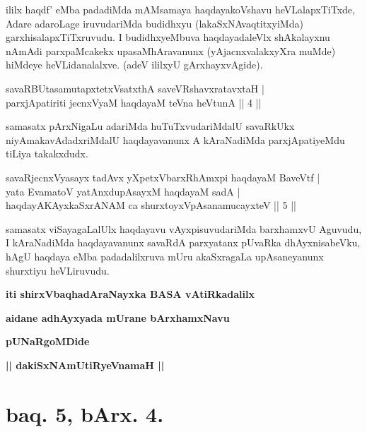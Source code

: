 \begin{artha}
ililx haqdf' eMba padadiMda mAMsamaya haqdayakoVshavu heVLalapxTiTxde, Adare adaroLage iruvudariMda budidhxyu (lakaSxNAvaqtitxyiMda) garxhisalapxTiTxruvudu. I budidhxyeMbuva haqdayadaleVlx shAkalayxnu nAmAdi parxpaMcakekx upasaMhAravanunx (yAjacnxvalakxyXra muMde) hiMdeye heVLidanalalxve. (adeV ililxyU gArxhayxvAgide).
\end{artha}


\begin{shl}
savaRBUtasamutapxtetxVsatxthA saveVRshavxratavxtaH | \\
parxjApatiriti jecnxVyaM haqdayaM teVna heVtunA \hfill ||  4 || 
\end{shl}

\begin{artha}
samasatx pArxNigaLu adariMda huTuTxvudariMdalU savaRkUkx niyAmakavAdadxriMdalU haqdayavanunx A kAraNadiMda parxjApatiyeMdu tiLiya takakxdudx.
\end{artha}


\begin{shl}
savaRjecnxVyasayx tadAvx	yXpetxVbarxRhAmxpi haqdayaM BaveVtf | \\
yata EvamatoV yatAnxdupAsayxM haqdayaM sadA  | \\
 haqdayAKAyxkaSxrANAM ca shurxtoyxVpAsanamucayxteV \hfill ||  5 ||
\end{shl}

\begin{artha}
samasatx viSayagaLalUlx haqdayavu vAyxpisuvudariMda barxhamxvU Aguvudu, I kAraNadiMda haqdayavanunx savaRdA parxyatanx pUvaRka dhAyxnisabeVku, hAgU haqdaya eMba padadalilxruva mUru akaSxragaLa upAsaneyanunx shurxtiyu heVLiruvudu.
\end{artha}

\begin{center}
{\bf iti shirxVbaqhadAraNayxka BASA vAtiRkadalilx}
\medskip

{\bf aidane adhAyxyada mUrane bArxhamxNavu}

\smallskip
{\bf pUNaRgoMDide}

\smallskip
{\bf || dakiSxNAmUtiRyeVnamaH ||}
\end{center}

\bigskip

\section*{baq. 5, bArx. 4.}

